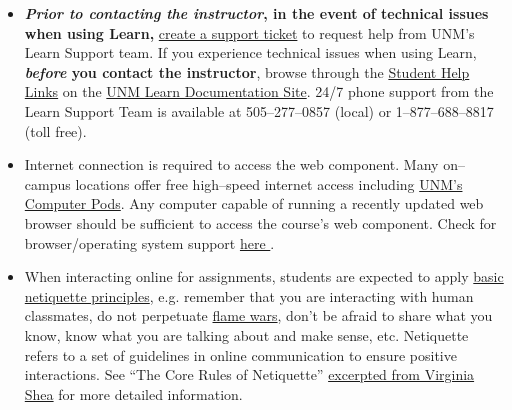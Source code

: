 \documentclass[11pt,a4paper,ragged2e,academicons]{altacv}
\begin{document}
\smallskip
{}
\begin{itemize}
\item \textbf{\emph{Prior to contacting the instructor}, in the event of technical issues when using Learn,} \href{http://online.unm.edu/help/learn/support/index.html}{create a support ticket} to request help from UNM's Learn Support team. If you experience technical issues when using Learn, \textbf{\emph{before} you contact the instructor}, browse through the \href{http://online.unm.edu/help/learn/students/}{Student Help Links} on the \href{https://online.unm.edu/help/}{UNM Learn Documentation Site}. 24/7 phone support from the Learn Support Team is available at 505--277--0857 (local) or 1--877--688--8817 (toll free).
\item Internet connection is required to access the web component. Many on--campus locations offer free high--speed internet access including \href{http://it.unm.edu/pods/locations.html}{UNM's Computer Pods}. Any computer capable of running a recently updated web browser should be sufficient to access the course's web component. Check for browser/operating system support \href{https://help.blackboard.com/Learn/Student/Getting_Started/Browser_Support/Browser_Checker}{here \faExternalLink}. 
\item When interacting online for assignments, students are expected to apply \href{http://www.albion.com/netiquette/introduction.html}{basic netiquette principles}, e.g. remember that you are interacting with human classmates, do not perpetuate \href{http://www.albion.com/netiquette/rule7.html}{flame wars}, don't be afraid to share what you know, know what you are talking about and make sense, etc.  Netiquette refers to a set of guidelines in online communication to ensure positive interactions. See ``The Core Rules of Netiquette''  \href{http://www.albion.com/netiquette/corerules.html}{excerpted from Virginia Shea} for more detailed information. 
\end{itemize}

\smallskip



\hspace{-3mm}


\hspace{-3mm}
\end{document}
